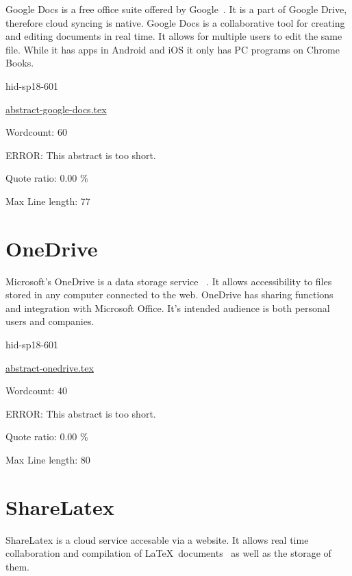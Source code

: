 Google Docs is a free office suite offered by 
Google~\cite{hid-sp18-601-www-gdoc-about}. It is a part of Google 
Drive, therefore cloud syncing is native. Google Docs is a collaborative tool
for creating and editing documents in real time. It allows for multiple users
to edit the same file. While it has apps in Android and iOS it only has PC
programs on Chrome Books.

\begin{IU}

hid-sp18-601

\href{https://github.com/cloudmesh-community/hid-sp18-601/blob/master//technology/abstract-google-docs.tex}{abstract-google-docs.tex}

 

Wordcount: 60

ERROR: This abstract is too short.


Quote ratio: 0.00 \%
 
Max Line length: 77
\end{IU}

\section{OneDrive}

Microsoft's OneDrive is a data storage service 
~\cite{hid-sp18-601-www-odrive-website}. It allows accessibility  to files
 stored in any computer connected to the web. OneDrive has sharing functions and
 integration with Microsoft Office. It's intended audience is both personal 
users and companies.

\begin{IU}

hid-sp18-601

\href{https://github.com/cloudmesh-community/hid-sp18-601/blob/master//technology/abstract-onedrive.tex}{abstract-onedrive.tex}

 

Wordcount: 40

ERROR: This abstract is too short.


Quote ratio: 0.00 \%
 
Max Line length: 80
\end{IU}

\section{ShareLatex}

ShareLatex is a cloud service accesable via a website. It allows real time 
collaboration and compilation of 
\LaTeX~documents~\cite{hid-sp18-601-www-slatex-documentation} as well as the 
storage of them. 
 
